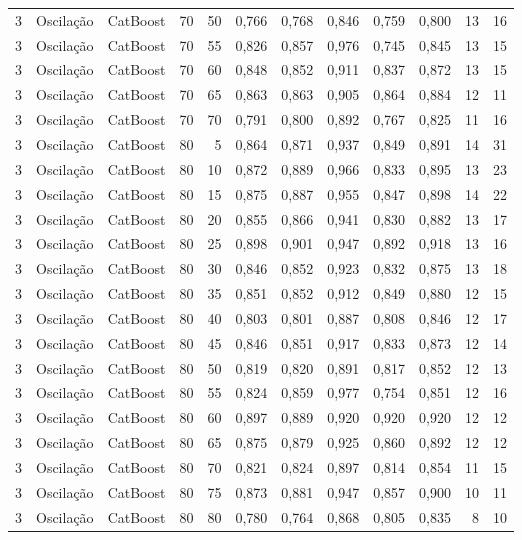 \begin{longtable}{@{}rllrrrrrrrrr@{}}
3 & Oscilação & CatBoost & 70 & 50 & 0,766 & 0,768 & 0,846 & 0,759 & 0,800 & 13 & 16 \\
3 & Oscilação & CatBoost & 70 & 55 & 0,826 & 0,857 & 0,976 & 0,745 & 0,845 & 13 & 15 \\
3 & Oscilação & CatBoost & 70 & 60 & 0,848 & 0,852 & 0,911 & 0,837 & 0,872 & 13 & 15 \\
3 & Oscilação & CatBoost & 70 & 65 & 0,863 & 0,863 & 0,905 & 0,864 & 0,884 & 12 & 11 \\
3 & Oscilação & CatBoost & 70 & 70 & 0,791 & 0,800 & 0,892 & 0,767 & 0,825 & 11 & 16 \\
3 & Oscilação & CatBoost & 80 & 5 & 0,864 & 0,871 & 0,937 & 0,849 & 0,891 & 14 & 31 \\
3 & Oscilação & CatBoost & 80 & 10 & 0,872 & 0,889 & 0,966 & 0,833 & 0,895 & 13 & 23 \\
3 & Oscilação & CatBoost & 80 & 15 & 0,875 & 0,887 & 0,955 & 0,847 & 0,898 & 14 & 22 \\
3 & Oscilação & CatBoost & 80 & 20 & 0,855 & 0,866 & 0,941 & 0,830 & 0,882 & 13 & 17 \\
3 & Oscilação & CatBoost & 80 & 25 & 0,898 & 0,901 & 0,947 & 0,892 & 0,918 & 13 & 16 \\
3 & Oscilação & CatBoost & 80 & 30 & 0,846 & 0,852 & 0,923 & 0,832 & 0,875 & 13 & 18 \\
3 & Oscilação & CatBoost & 80 & 35 & 0,851 & 0,852 & 0,912 & 0,849 & 0,880 & 12 & 15 \\
3 & Oscilação & CatBoost & 80 & 40 & 0,803 & 0,801 & 0,887 & 0,808 & 0,846 & 12 & 17 \\
3 & Oscilação & CatBoost & 80 & 45 & 0,846 & 0,851 & 0,917 & 0,833 & 0,873 & 12 & 14 \\
3 & Oscilação & CatBoost & 80 & 50 & 0,819 & 0,820 & 0,891 & 0,817 & 0,852 & 12 & 13 \\
3 & Oscilação & CatBoost & 80 & 55 & 0,824 & 0,859 & 0,977 & 0,754 & 0,851 & 12 & 16 \\
3 & Oscilação & CatBoost & 80 & 60 & 0,897 & 0,889 & 0,920 & 0,920 & 0,920 & 12 & 12 \\
3 & Oscilação & CatBoost & 80 & 65 & 0,875 & 0,879 & 0,925 & 0,860 & 0,892 & 12 & 12 \\
3 & Oscilação & CatBoost & 80 & 70 & 0,821 & 0,824 & 0,897 & 0,814 & 0,854 & 11 & 15 \\
3 & Oscilação & CatBoost & 80 & 75 & 0,873 & 0,881 & 0,947 & 0,857 & 0,900 & 10 & 11 \\
3 & Oscilação & CatBoost & 80 & 80 & 0,780 & 0,764 & 0,868 & 0,805 & 0,835 & 8 & 10 \\

\end{longtable}
